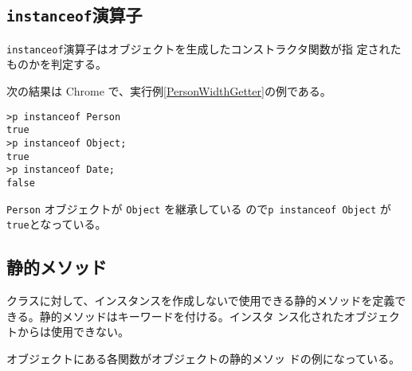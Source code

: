 \subsection{\protect\texttt{instanceof}演算子}
\texttt{instanceof}演算子はオブジェクトを生成したコンストラクタ関数が指
定されたものかを判定する。
\begin{Exec}\upshape
次の結果は Chrome で、実行例\ref{PersonWidthGetter}の例である。
\begin{Verbatim}
>p instanceof Person
true
>p instanceof Object;
true
>p instanceof Date;
false
\end{Verbatim}
\Verb+Person+ オブジェクトが \Verb+Object+ を継承している
 ので\texttt{p instanceof Object} が\texttt{true}となっている。
\end{Exec}
\subsection{静的メソッド}
クラスに対して、インスタンスを作成しないで使用できる静的メソッドを定義で
きる。静的メソッドはキーワードを付ける。インスタ
ンス化されたオブジェクトからは使用できない。

オブジェクトにある各関数がオブジェクトの静的メソッ
ドの例になっている。

